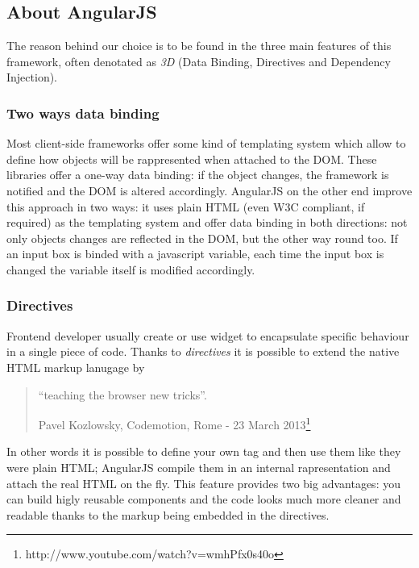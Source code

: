 \documentclass[a4paper,12pt]{report}
\begin{document}
\subsection{About AngularJS}
The reason behind our choice is to be found in the three main features of this framework, often denotated as \emph{3D} (Data Binding, Directives and Dependency Injection).
\subsubsection{Two ways data binding}
Most client-side frameworks offer some kind of templating system which allow to define how objects will be rappresented when attached to the DOM. These libraries offer a one-way data binding: if the object changes, the framework is notified and the DOM is altered accordingly.
AngularJS on the other end improve this approach in two ways: it uses plain HTML (even W3C compliant, if required) as the templating system and offer data binding in both directions: not only objects changes are reflected in the DOM, but the other way round too. If an input box is binded with a javascript variable, each time the input box is changed the variable itself is modified accordingly.
\subsubsection{Directives}
Frontend developer usually create or use widget to encapsulate specific behaviour in a single piece of code. Thanks to \emph{directives} it is possible to extend the native HTML markup lanugage by \begin{quotation}
``teaching the browser new tricks''.
\begin{flushright}
Pavel Kozlowsky, Codemotion, Rome - 23 March 2013\footnote{http://www.youtube.com/watch?v=wmhPfx0s40o}
\end{flushright}
\end{quotation}
In other words it is possible to define your own tag and then use them like they were plain HTML; AngularJS compile them in an internal rapresentation and attach the real HTML on the fly.
This feature provides two big advantages: you can build higly reusable components and the code looks much more cleaner and readable thanks to the markup being embedded in the directives. 
\end{document}
